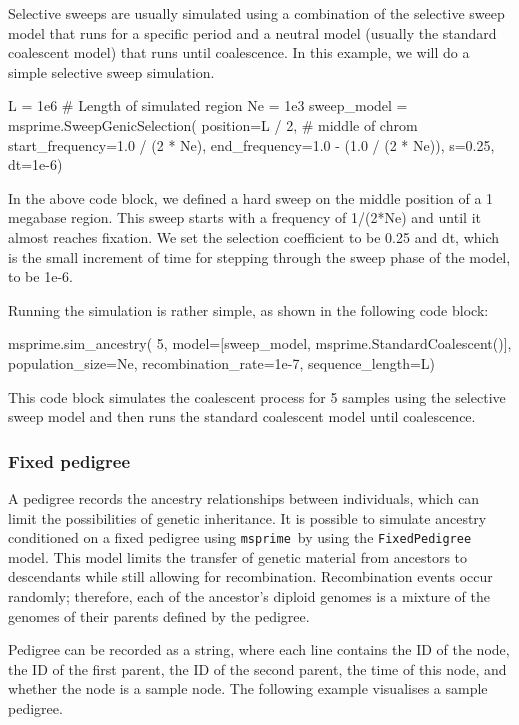 \documentclass[graybox]{svmult}
\newcommand{\msprime}[0]{\texttt{msprime}}
\begin{document}
Selective sweeps are usually simulated using a combination of the selective sweep model that runs for a specific
period and a neutral model (usually the standard coalescent model) that runs until coalescence. In this example,
we will do a simple selective sweep simulation.

\begin{pythoncode}
L = 1e6  # Length of simulated region
Ne = 1e3
sweep_model = msprime.SweepGenicSelection(
    position=L / 2,  # middle of chrom
    start_frequency=1.0 / (2 * Ne),
    end_frequency=1.0 - (1.0 / (2 * Ne)),
    s=0.25, dt=1e-6)
\end{pythoncode}

In the above code block, we defined a hard sweep on the middle position of a 1 megabase region. This sweep starts with a frequency of 1/(2*Ne) and
until it almost reaches fixation. We set the selection coefficient to be 0.25 and dt, which is the small increment of time for stepping through the sweep
phase of the model, to be 1e-6.

Running the simulation is rather simple, as shown in the following code block:

\begin{pythoncode}
msprime.sim_ancestry(
    5,
    model=[sweep_model,
           msprime.StandardCoalescent()],
    population_size=Ne, recombination_rate=1e-7,
    sequence_length=L)
\end{pythoncode}

This code block simulates the coalescent process for 5 samples using the selective sweep model and then runs the standard coalescent model until
coalescence.

\subsubsection{Fixed pedigree}\label{fixed-pedigree}

A pedigree records the ancestry relationships between individuals, which can limit the possibilities of genetic inheritance. It is possible to
simulate ancestry conditioned on a fixed pedigree using \msprime\ by using the \texttt{FixedPedigree} model. This model limits the transfer of
genetic material from ancestors to descendants while still allowing for recombination. Recombination events occur randomly; therefore, each of
the ancestor's diploid genomes is a mixture of the genomes of their parents defined by the pedigree.

Pedigree can be recorded as a string, where each line contains the ID of the node, the ID of the first parent, the ID of the
second parent, the time of this node, and whether the node is a sample node. The following example visualises a sample pedigree.
\end{document}
